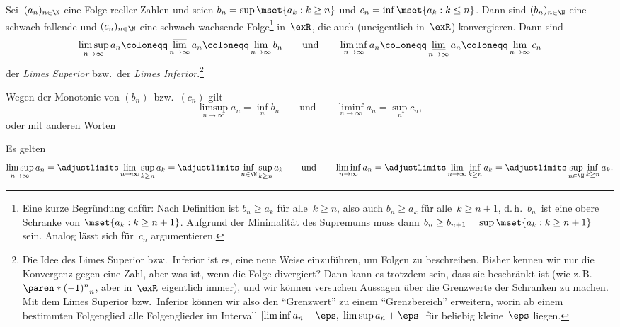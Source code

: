 \documentclass[a4paper]{article}
\begin{document}
\begin{definition}
    Sei~$(a_n)_{n\in\N}$ eine Folge reeller Zahlen und seien $b_n = \sup\mset{a_k : k \geq n}$ und $c_n = \inf\mset{a_k : k \leq n}$. Dann sind $(b_n)_{n\in\N}$ eine schwach fallende und $(c_n)_{n\in\N}$ eine schwach wachsende Folge\footnote{Eine kurze Begründung dafür: Nach Definition ist $b_n \geq a_k$ für alle~$k \geq n$, also auch $b_n \geq a_k$ für alle~$k \geq n+1$, d.\,h.\ $b_n$~ist eine obere Schranke von $\mset{a_k : k \geq n+1}$. Aufgrund der Minimalität des Supremums muss dann $b_n \geq b_{n+1} = \sup\mset{a_k : k \geq n+1}$ sein. Analog lässt sich für~$c_n$ argumentieren.} in~$\exR$, die auch (uneigentlich in~$\exR$) konvergieren. Dann sind
    \begin{equation*}
        \limsup_{n\to\infty} a_n \coloneqq \varlimsup_{n\to\infty} a_n \coloneqq \lim_{n\to\infty} b_n \qquad\text{und}\qquad \liminf_{n\to\infty} a_n \coloneqq \varliminf_{n\to\infty} a_n \coloneqq \lim_{n\to\infty} c_n
    \end{equation*}
    der \emph{Limes Superior} bzw.\ der \emph{Limes Inferior}.\footnote{Die Idee des Limes Superior bzw.\ Inferior ist es, eine neue Weise einzuführen, um Folgen zu beschreiben. Bisher kennen wir nur die Konvergenz gegen eine Zahl, aber was ist, wenn die Folge divergiert? Dann kann es trotzdem sein, dass sie beschränkt ist (wie z.\,B.\ $\paren*{(-1)^n}_n$, aber in~$\exR$ eigentlich immer), und wir können versuchen Aussagen über die Grenzwerte der Schranken zu machen. Mit dem Limes Superior bzw.\ Inferior können wir also den "`Grenzwert"' zu einem "`Grenzbereich"' erweitern, worin ab einem bestimmten Folgenglied alle Folgenglieder im Intervall $[\liminf a_n-\eps,\; \limsup a_n+\eps]$ für beliebig kleine~$\eps$ liegen.}
\end{definition}

Wegen der Monotonie von $(b_n)$~bzw.~$(c_n)$ gilt
\begin{equation*}
    \limsup_{n\to\infty} a_n = \inf_n b_n \qquad\text{und}\qquad \liminf_{n\to\infty} a_n = \sup_n c_n,
\end{equation*}
oder mit anderen Worten
\begin{lemma}\label{lem:infsup}
    Es gelten
    \begin{equation*}
        \limsup_{n\to\infty} a_n = \adjustlimits\lim_{n\to\infty} \sup_{k\geq n} a_k = \adjustlimits\inf_{n\in\N} \sup_{k\geq n} a_k \qquad\text{und}\qquad \liminf_{n\to\infty} a_n = \adjustlimits\lim_{n\to\infty} \inf_{k\geq n} a_k = \adjustlimits\sup_{n\in\N} \inf_{k\geq n} a_k.
    \end{equation*}
\end{lemma}
\end{document}
